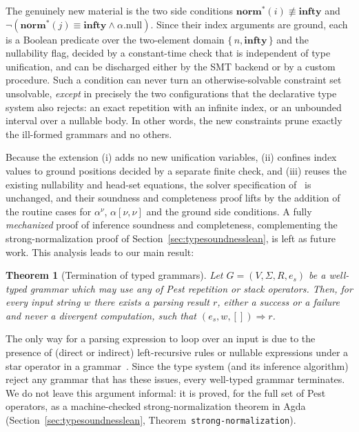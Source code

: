 \documentclass[preprint,12pt]{elsarticle}
\newtheorem{Theorem}{Theorem}
\theoremstyle{definition}
\begin{document}
The genuinely new material is the two side conditions
$\mathbf{norm}^{\ast}(i) \not\equiv \mathbf{infty}$ and
$\neg(\mathbf{norm}^{\ast}(j) \equiv \mathbf{infty} \land \alpha.\mathrm{null})$. Since
their index arguments are ground, each is a Boolean predicate over the
two-element domain $\{\, n, \mathbf{infty}\,\}$ and the nullability flag, decided
by a constant-time check that is independent of type unification, and can be discharged
either by the SMT backend or by a custom procedure. Such a condition can
never turn an otherwise-solvable constraint set unsolvable, \emph{except} in
precisely the two configurations that the declarative type system also rejects:
an exact repetition with an infinite index, or an unbounded interval over a
nullable body. In other words, the new constraints prune exactly the ill-formed
grammars and no others.

Because the extension (i) adds no new unification variables, (ii) confines index
values to ground positions decided by a separate finite check, and (iii) reuses
the existing nullability and head-set equations, the solver specification
of~\cite{Cardoso23} is unchanged, and their soundness and completeness proof lifts
by the addition of the routine cases for $\alpha^{\nu}$, $\alpha[\nu,\nu]$ and the
ground side conditions. A fully \emph{mechanized} proof of inference soundness and
completeness, complementing the strong-normalization proof of
Section~\ref{sec:typesoundnesslean}, is left as future work. This analysis
leads to our main result:

\begin{Theorem}[Termination of typed grammars]\label{thm:termination}
  Let $G = (V,\Sigma,R, e_s)$ be a well-typed grammar which may use any of Pest
  repetition or stack operators. Then, for every input string $w$ there exists a
  parsing result $r$, either a success or a failure and never a divergent computation, such that $(e_s,w,[])\Rightarrow r$.
\end{Theorem}

The only way for a parsing expression to loop over an input is due to
the presence of (direct or indirect) left-recursive rules or nullable expressions
under a star operator in a grammar~\cite{Ford2004}. Since the type system (and its
inference algorithm) reject any grammar that has these issues, every well-typed
grammar terminates. We do not leave this argument informal: it is proved, for the
full set of Pest operators, as a machine-checked strong-normalization theorem in
Agda (Section~\ref{sec:typesoundnesslean}, Theorem~\lstinline{strong-normalization}).
\end{document}
